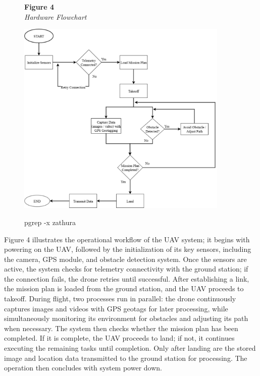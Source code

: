 \begin{figure}[H]
	\raggedright
	\textbf{Figure 4} \\ %
	\textit{Hardware Flowchart} %

	\vspace{0.5em}
	\centering
	\includegraphics[width=0.9\textwidth]{figures/Hard_Flow.pdf} %

	\vspace{0.5em}
	\raggedright

pgrep -x zathura
	\label{fig:HardFlow}
\end{figure}

Figure 4 illustrates the operational workflow of the UAV system; it begins with powering on the UAV, followed by the initialization of its key sensors, including the camera, GPS module, and obstacle detection system. Once the sensors are active, the system checks for telemetry connectivity with the ground station; if the connection fails, the drone retries until successful. After establishing a link, the mission plan is loaded from the ground station, and the UAV proceeds to takeoff. During flight, two processes run in parallel: the drone continuously captures images and videos with GPS geotags for later processing, while simultaneously monitoring its environment for obstacles and adjusting its path when necessary. The system then checks whether the mission plan has been completed. If it is complete, the UAV proceeds to land; if not, it continues executing the remaining tasks until completion. Only after landing are the stored image and location data transmitted to the ground station for processing. The operation then concludes with system power down.

